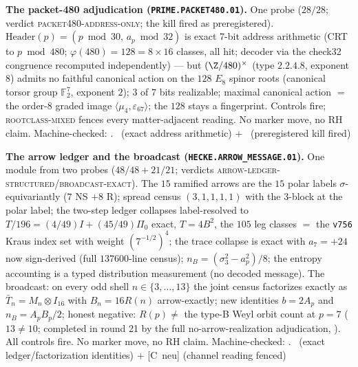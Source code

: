 \par\smallskip\noindent\textbf{The packet-480 adjudication
(\texttt{PRIME.PACKET480.01}).}
One probe ($28/28$; verdict \textsc{packet480-address-only}; the
kill fired as preregistered).  $\mathrm{Header}(p)=(p\bmod30,\,
a_p\bmod32)$ is exact 7-bit address arithmetic (CRT to $p\bmod
480$; $\varphi(480)=128=8\times16$ classes, all hit; decoder via
the check32 congruence recomputed independently) --- but
$(\Z/480)^\times$ (type $2.2.4.8$, exponent $8$) admits no faithful
canonical action on the $128$ $E_8$ spinor roots (canonical torsor
group $\mathbb F_2^7$, exponent $2$); $3$ of $7$ bits realizable;
maximal canonical action $=$ the order-8 graded image
$\langle\mu_4,\varepsilon_{67}\rangle$; the $128$ stays a
fingerprint.  Controls fire; \textsc{rootclass-mixed} fences every
matter-adjacent reading.  No marker move, no RH claim.
Machine-checked: .
\mE\ (exact address arithmetic) $+$ \mX\ (preregistered kill fired)
\par\smallskip


\par\smallskip\noindent\textbf{The arrow ledger and the broadcast
(\texttt{HECKE.ARROW\_MESSAGE.01}).}
One module from two probes ($48/48+21/21$; verdicts
\textsc{arrow-ledger-structured}/\textsc{broadcast-exact}).  The
$15$ ramified arrows are the $15$ polar labels
$\sigma$-equivariantly ($7$ NS $+8$ R); spread census
$(3,1,1,1,1)$ with the 3-block at the polar label; the two-step
ledger collapses label-resolved to $T/196=(4/49)I+(45/49)\Pi_0$
exact, $T=4B^2$, the $105$ leg classes $=$ the \texttt{v756} Kraus
index set with weight $(7^{-1/2})^4$; the trace collapse is exact
with $a_7=+24$ now sign-derived (full $137600$-line census);
$n_B=(\sigma_3^2-a_p^2)/8$; the entropy accounting is a typed
distribution measurement (no decoded message).  The broadcast: on
every odd shell $n\in\{3,\dots,13\}$ the joint census factorizes
exactly as $\bar T_n=M_n\otimes I_{16}$ with $B_n=16R(n)$
arrow-exactly; new identities $b=2A_p$ and $n_B=A_pB_p/2$; honest
negative: $R(p)\neq$ the type-B Weyl orbit count at $p=7$
($13\neq10$; completed in round 21 by the full no-arrow-realization
adjudication, ).  All
controls fire.  No marker move, no RH claim.
Machine-checked: .
\mE\ (exact ledger/factorization identities) $+$ [C~neu] (channel
reading fenced)
\par\smallskip


